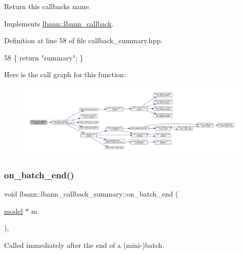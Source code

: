 Return this callback\textquotesingle{}s name. 

Implements \hyperlink{classlbann_1_1lbann__callback_a7522c7a14f1d6a1ea762cc2d7248eb3a}{lbann\+::lbann\+\_\+callback}.



Definition at line 58 of file callback\+\_\+summary.\+hpp.


\begin{DoxyCode}
58 \{ \textcolor{keywordflow}{return} \textcolor{stringliteral}{"summary"}; \}
\end{DoxyCode}
Here is the call graph for this function\+:\nopagebreak
\begin{figure}[H]
\begin{center}
\leavevmode
\includegraphics[width=350pt]{classlbann_1_1lbann__callback__summary_a79814488c1ed0123b335a4cd1a236724_cgraph}
\end{center}
\end{figure}
\mbox{\label{classlbann_1_1lbann__callback__summary_a89b18186fdaa7b6a7a0e9ab8ee334d88}} 
\subsubsection{\texorpdfstring{on\+\_\+batch\+\_\+end()}{on\_batch\_end()}}
{\footnotesize\ttfamily void lbann\+::lbann\+\_\+callback\+\_\+summary\+::on\+\_\+batch\+\_\+end (\begin{DoxyParamCaption}\item[{\hyperlink{classlbann_1_1model}{model} $\ast$}]{m }\end{DoxyParamCaption})\hspace{0.3cm}{\ttfamily [override]}, {\ttfamily [virtual]}}

Called immediately after the end of a (mini-\/)batch. 

